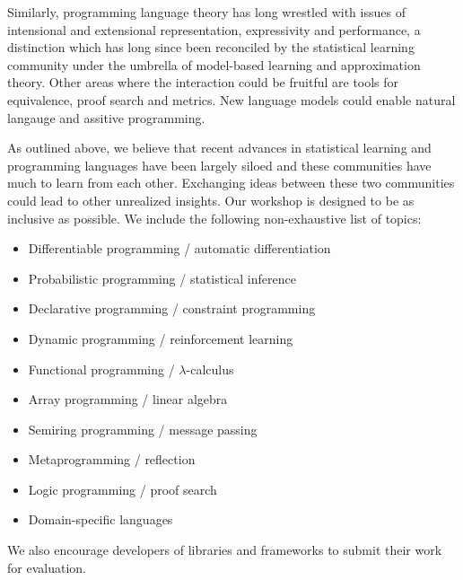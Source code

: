 \documentclass{article}
\begin{document}
    Similarly, programming language theory has long wrestled with issues of intensional and extensional representation, expressivity and performance, a distinction which has long since been reconciled by the statistical learning community under the umbrella of model-based learning and approximation theory. Other areas where the interaction could be fruitful are tools for equivalence, proof search and metrics. New language models could enable natural langauge and assitive programming.

    As outlined above, we believe that recent advances in statistical learning and programming languages have been largely siloed and these communities have much to learn from each other. Exchanging ideas between these two communities could lead to other unrealized insights. Our workshop is designed to be as inclusive as possible. We include the following non-exhaustive list of topics:

    \begin{itemize}
      \item Differentiable programming / automatic differentiation
      \item Probabilistic programming / statistical inference
      \item Declarative programming / constraint programming
      \item Dynamic programming / reinforcement learning
      \item Functional programming / $\lambda$-calculus
      \item Array programming / linear algebra
      \item Semiring programming / message passing
      \item Metaprogramming / reflection
      \item Logic programming / proof search
      \item Domain-specific languages
    \end{itemize}

    We also encourage developers of libraries and frameworks to submit their work for evaluation.
\end{document}
